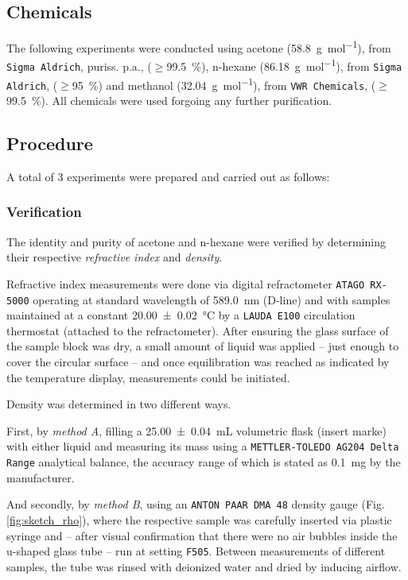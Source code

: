 


\subsection{Chemicals}
The following experiments were conducted using acetone (\qty{58.8}{\gram\per\mole}), from \texttt{Sigma Aldrich}, puriss. p.a., ($\geq$\qty{99.5}{\percent}), n-hexane (\qty{86.18}{\gram\per\mole}), from \texttt{Sigma Aldrich}, ($\geq$\qty{95}{\percent}) and methanol (\qty{32.04}{\gram\per\mole}), from \texttt{VWR Chemicals}, ($\geq$\qty{99.5}{\percent}). All chemicals were used forgoing any further purification.

\subsection{Procedure}
A total of 3 experiments were prepared and carried out as follows:

\subsubsection{Verification}

The identity and purity of acetone and n-hexane were verified by determining their respective \textit{refractive index} and \textit{density}. 

Refractive index measurements were done via digital refractometer \texttt{ATAGO RX-5000} operating at standard wavelength of \qty{589.0}{\nano\meter} (D-line) and with samples maintained at a constant \qty{20.00 \pm 0.02}{\celsius} by a \texttt{LAUDA E100} circulation thermostat (attached to the refractometer). After ensuring the glass surface of the sample block was dry, a small amount of liquid was applied – just enough to cover the circular surface – and once equilibration was reached as indicated by the temperature display, measurements could be initiated.

Density was determined in two different ways.

First, by \textit{method A}, filling a \qty{25.00 \pm 0.04}{\milli\liter} volumetric flask (insert marke) with either liquid and measuring its mass using a \texttt{METTLER-TOLEDO AG204 Delta Range} analytical balance, the accuracy range of which is stated as \qty{0.1}{\milli\gram} by the manufacturer.

And secondly, by \textit{method B}, using an \texttt{ANTON PAAR DMA 48} density gauge (Fig. \ref{fig:sketch_rho}), where the respective sample was carefully inserted via plastic syringe and – after visual confirmation that there were no air bubbles inside the u-shaped glass tube – run at setting \texttt{F505}. Between measurements of different samples, the tube was rinsed with deionized water and dried by inducing airflow.

